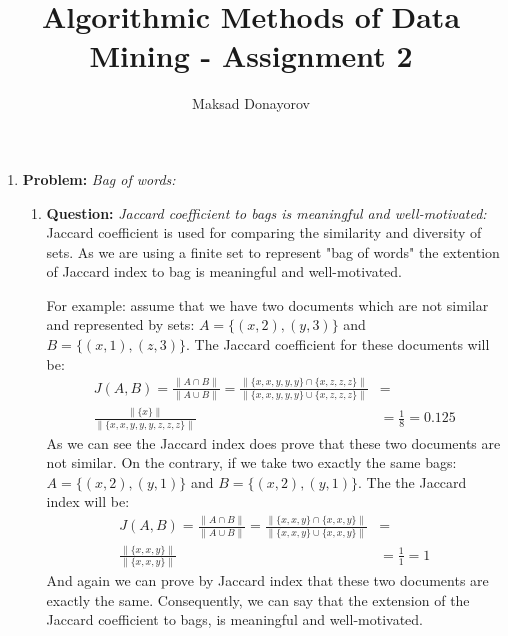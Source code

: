 \documentclass[11pt,a4paper,english]{article}
\title{Algorithmic Methods of Data Mining - Assignment 2}
\author{Maksad Donayorov}
\begin{document}
    \maketitle

    \begin{enumerate}
      \item \textbf{Problem:} \textit{Bag of words:}
        \begin{enumerate}
          \item \textbf{Question:} \textit{Jaccard coefficient to bags is meaningful and well-motivated:}\\
            Jaccard coefficient is used for comparing the similarity and diversity of sets. As we are using a finite set to represent "bag of words" the extention of Jaccard index to bag is meaningful and well-motivated.

            For example: assume that we have two documents which are not similar and represented by sets: $A = \{(x, 2), (y, 3)\}$ and $B = \{(x, 1),(z, 3)\}$. The Jaccard coefficient for these documents will be:
            \begin{align*}
              J(A, B) = \frac{\|A \cap B\|}{\|A \cup B\|} =
              \frac{ \| \{x,x,y,y,y\} \cap \{x,z,z,z\} \| }{ \| \{x,x,y,y,y\} \cup \{x,z,z,z\} \| } & = \\
              \frac{ \| \{x\} \| }{ \| \{ x,x,y,y,y,z,z,z \} \| } & = \frac{1}{8} = 0.125
            \end{align*}
            As we can see the Jaccard index does prove that these two documents are not similar.
            On the contrary, if we take two exactly the same bags: $A = \{(x, 2), (y, 1)\}$ and $B = \{(x, 2),(y, 1)\}$. The the Jaccard index will be:
            \begin{align*}
              J(A, B) = \frac{\|A \cap B\|}{\|A \cup B\|} =
              \frac{ \| \{x,x,y\} \cap \{x,x,y\} \| }{ \| \{x,x,y\} \cup \{x,x,y\} \| } & = \\
              \frac{ \| \{x,x,y\} \| }{ \| \{ x,x,y \} \| } & = \frac{1}{1} = 1
            \end{align*}
            And again we can prove by Jaccard index that these two documents are exactly the same. Consequently, we can say that the extension of the Jaccard coefficient to bags, is
            meaningful and well-motivated.


\end{enumerate}
\end{enumerate}
\end{document}
